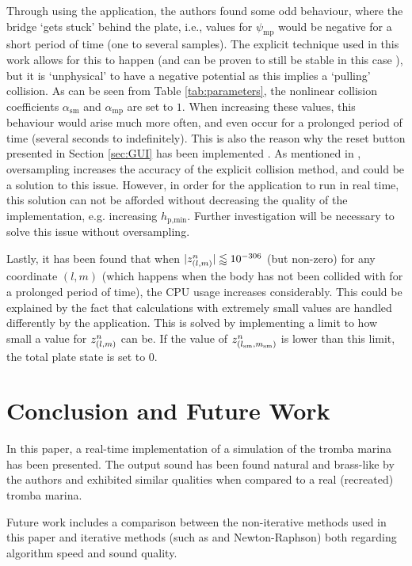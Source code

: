     Through using the application, the authors found some odd behaviour, where the bridge `gets stuck' behind the plate, i.e., values for $\psi_\text{mp}$ would be negative for a short period of time (one to several samples). The explicit technique used in this work allows for this to happen (and can be proven to still be stable in this case \cite{Ducceschi2019}), but it is `unphysical' to have a negative potential as this implies a `pulling' collision. As can be seen from Table \ref{tab:parameters}, the nonlinear collision coefficients $\alpha_\text{sm}$ and $\alpha_\text{mp}$ are set to $1$. When increasing these values, this behaviour would arise much more often, and even occur for a prolonged period of time (several seconds to indefinitely). This is also the reason why the reset button presented in Section \ref{sec:GUI} has been implemented%
    . As mentioned in \cite{Ducceschi2019}, oversampling increases the accuracy of the explicit collision method, and could be a solution to this issue. However, in order for the application to run in real time, this solution can not be afforded without decreasing the quality of the implementation, e.g. increasing $h_{\text{p},\text{min}}$. Further investigation will be necessary to solve this issue without oversampling.
    
    Lastly, it has been found that when $|z_{(l,m)}^n| \lessapprox 10^{-306}$ (but non-zero) for any coordinate $(l,m)$ (which happens when the body has not been collided with for a prolonged period of time), the CPU usage increases considerably. This could be explained by the fact that calculations with extremely small values are handled differently by the application.  %
    This is solved by implementing a limit to how small a value for $z_{(l,m)}^n$ can be. If the value of $z_{(l_\text{sm},m_\text{sm})}^n$ is lower than this limit, the total plate state is set to $0$. 
    
    \section{Conclusion and Future Work}\label{sec:conclusion}
    In this paper, a real-time implementation of a simulation of the tromba marina has been presented. The output sound has been found natural and brass-like by the authors and exhibited similar qualities when compared to a real (recreated) tromba marina.
    
    Future work includes a comparison between the non-iterative methods used in this paper and iterative methods (such as and Newton-Raphson) both regarding algorithm speed and sound quality. 
    
